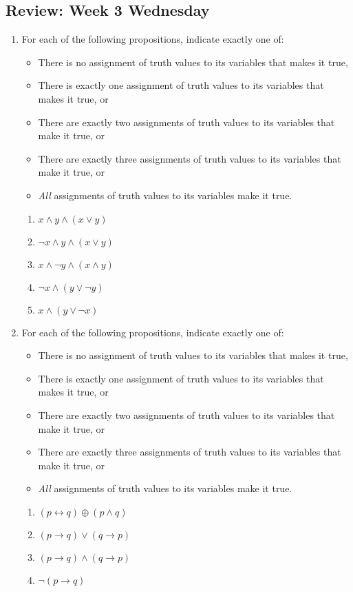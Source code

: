 \documentclass[12pt, oneside]{article}
\begin{document}
\subsection*{Review: Week 3 Wednesday}
\begin{enumerate}
    \item 

For each of the following propositions, indicate exactly one of:

\begin{itemize}
    \item There is no assignment of truth values to its variables that makes it true,
    \item There is exactly one assignment of truth values to its variables that makes it true, or
    \item There are exactly two assignments of truth values to its variables that make it true, or
    \item There are exactly three assignments of truth values to its variables that make it true, or
    \item \emph{All} assignments of truth values to its variables make it true.
\end{itemize}

\begin{enumerate}
    \item $x \land y \land (x \lor y)$
    \item $\lnot x \land y \land (x \lor y)$
    \item $x \land \lnot y \land (x \land y)$
    \item $\lnot x \land (y \lor \lnot y)$
    \item $x \land (y \lor \lnot x)$
\end{enumerate}     \item 

For each of the following propositions, indicate exactly one of:

\begin{itemize}
    \item There is no assignment of truth values to its variables that makes it true,
    \item There is exactly one assignment of truth values to its variables that makes it true, or
    \item There are exactly two assignments of truth values to its variables that make it true, or
    \item There are exactly three assignments of truth values to its variables that make it true, or
    \item \emph{All} assignments of truth values to its variables make it true.
\end{itemize}

\begin{enumerate}
    \item $(p \leftrightarrow q) \oplus (p \land q)$
    \item $(p \to q) \vee (q \to p)$
    \item $(p \to q) \land (q \to p)$
    \item $\lnot (p \to q) $
\end{enumerate} \end{enumerate}
\newpage
\end{document}
